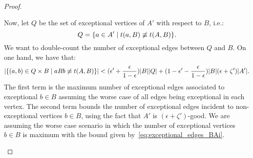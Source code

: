 \begin{lemma}
\begin{proof}
\begin{enumerate}[label={\Roman*}., ref={\Roman*}, font=\rmfamily]
                    Now, let $Q$ be the set of exceptional vertices of $A'$ with respect to $B$, i.e.:
                    \[
                        Q = \{ a \in A' \mid t(a, B) \not\equiv t(A, B) \}.
                    \]
                    We want to double-count the number of exceptional edges between $Q$ and $B$.
                    On one hand, we have that:
                    \[
                        | \{ (a,b) \in Q \times B \mid aRb \not\equiv t(A, B) \} | <
                        ( \epsilon' + \frac{\epsilon}{1 - \epsilon} ) | B | | Q | +
                        ( 1 - \epsilon' - \frac{\epsilon}{1 - \epsilon} ) | B | ( \epsilon + \zeta' ) | A' |.
                    \]
                    The first term is the maximum number of exceptional edges associated to exceptional $b \in B$
                    assuming the worse case of all edges being exceptional in each vertex.
                    The second term bounds the number of exceptional edges incident to
                    non-exceptional vertices $b \in B$, using the fact that $A'$ is $(\epsilon + \zeta')$-good.
                    We are assuming the worse case scenario in which the number of exceptional vertices $b \in B$ is maximum
                    with the bound given by~\eqref{eq:exceptional_edges_BAi}.


\end{enumerate}
\end{proof}
\end{lemma}

